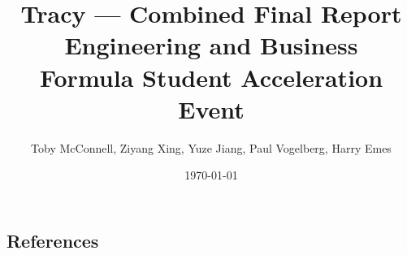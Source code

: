 \documentclass[11pt, a4paper]{report}
\title{Tracy --- Combined Final Report \\ Engineering and Business \\ Formula Student Acceleration Event}
\author{Toby McConnell, Ziyang Xing, Yuze Jiang, Paul Vogelberg, Harry Emes}
\date{\today}
\numberwithin{equation}{section}
\newcommand{\compactbib}{%
  \vspace{-16pt}%
  \enlargethispage{20pt}%
  \section*{References}%
  \vspace{-33pt}%
  \begingroup
    \begin{singlespace}%
      \begin{multicols}{2}%
        \scriptsize
        \setlength{\bibitemsep}{0pt}%
        \printbibliography[heading=none]%
      \end{multicols}%
    \end{singlespace}%
  \endgroup
}
\begin{document}

\maketitle
\newpage

\setcounter{page}{1}

\tableofcontents
\newpage

\setcounter{page}{1}


\begin{refsection}
\graphicspath{{../TobyMcConnell/Engineering/}}

\end{refsection}

\begin{refsection}
\graphicspath{{../MichaelZiyangXing/}}

\compactbib
\end{refsection}

\begin{refsection}
\graphicspath{{yuze_assets/}}

\end{refsection}

\begin{refsection}
\graphicspath{{../PaulVogelberg/Engineering/}}

\end{refsection}

\begin{refsection}
\graphicspath{{../HarryEmes/Engineering/}{../../figures/}}

\end{refsection}


\begin{refsection}
\graphicspath{{../TobyMcConnell/Business/}}

\end{refsection}
\end{document}
